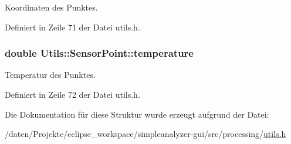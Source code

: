 Koordinaten des Punktes. 



Definiert in Zeile 71 der Datei utils.\-h.

\hypertarget{structUtils_1_1SensorPoint_a764d6572f865138b36cb46c910001e9a}{
\subsubsection[{temperature}]{\setlength{\rightskip}{0pt plus 5cm}double Utils\-::\-Sensor\-Point\-::temperature}}\label{structUtils_1_1SensorPoint_a764d6572f865138b36cb46c910001e9a}


Temperatur des Punktes. 



Definiert in Zeile 72 der Datei utils.\-h.



Die Dokumentation für diese Struktur wurde erzeugt aufgrund der Datei\-:\begin{DoxyCompactItemize}
\item 
/daten/\-Projekte/eclipse\-\_\-workspace/simpleanalyzer-\/gui/src/processing/\hyperlink{simpleanalyzer-gui_2src_2processing_2utils_8h}{utils.\-h}\end{DoxyCompactItemize}

